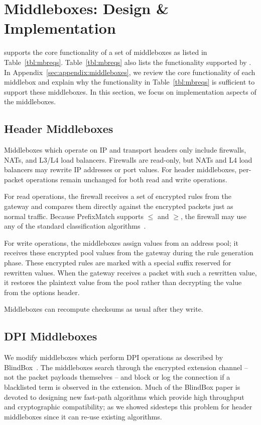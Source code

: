

\section{Middleboxes: Design \& Implementation}
\label{sec:mbs}

 \sys supports the core functionality of a set of middleboxes as listed in Table~\ref{tbl:mbreqs}.
Table~\ref{tbl:mbreqs} also lists the functionality supported by \sys.   In Appendix~\ref{sec:appendix:middleboxes}, we review the core functionality of each middlebox
  and explain why the functionality in Table~\ref{tbl:mbreqs} is sufficient to support these middleboxes. 
 In this section, we focus on implementation aspects of the middleboxes.



\subsection{Header Middleboxes}
Middleboxes which operate on IP and transport headers only include firewalls, NATs, and L3/L4 load balancers.
Firewalls are read-only, but NATs and L4 load balancers may rewrite IP addresses or port values. 
For header middleboxes, per-packet operations remain unchanged for both read and write operations.

For read operations, the firewall receives a set of encrypted rules from the gateway and compares them directly against the encrypted packets just as normal traffic. Because PrefixMatch supports $\leq$ and $\geq$, the firewall may use any of the standard classification algorithms~\cite{packet_classif}.




For write operations, the middleboxes assign values from an address pool; it receives these encrypted pool values from the gateway during the rule generation phase.
These encrypted rules are marked with a special suffix reserved for rewritten values.
When the gateway receives a packet with such a rewritten value, it restores the plaintext value from the pool rather than decrypting the value from the options header. 

Middleboxes can recompute checksums as usual after they write.

\subsection{DPI Middleboxes}
We modify middleboxes which perform DPI operations as described by BlindBox~\cite{blindbox}. 
The middleboxes search through the encrypted extension channel -- not the packet payloads themselves -- and block or log the connection if a blacklisted term is observed in the extension.
Much of the BlindBox paper is devoted to designing new fast-path algorithms which provide high throughput and cryptographic compatibility; as we showed \sys sidesteps this problem for header middleboxes since it can re-use existing algorithms.

